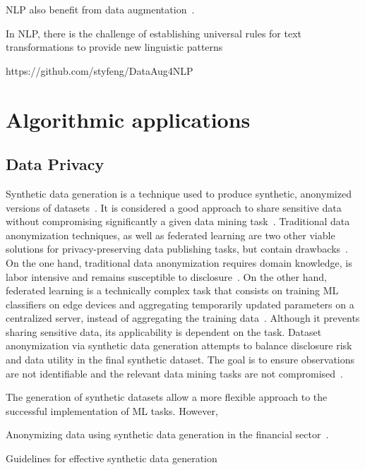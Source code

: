 \documentclass[parskip=full]{scrartcl}
\begin{document}
NLP also benefit from data augmentation~\cite{feng2021survey}.

In NLP, there is the challenge of establishing universal rules for text
transformations to provide new linguistic patterns~\cite{bayer2022data}

https://github.com/styfeng/DataAug4NLP

\section{Algorithmic applications}

\subsection{Data Privacy}

Synthetic data generation is a technique used to produce synthetic, anonymized
versions of datasets~\cite{dankar2021fake}. It is considered a good approach
to share sensitive data without compromising significantly a given data mining
task~\cite{taub2018differential, park2018data}. Traditional data anonymization
techniques, as well as federated learning are two other viable solutions for
privacy-preserving data publishing tasks, but contain
drawbacks~\cite{hernandez2022synthetic}. On the one hand, traditional data
anonymization requires domain knowledge, is labor intensive and remains
susceptible to disclosure~\cite{reiter2004new}. On the other hand, federated
learning is a technically complex task that consists on training ML
classifiers on edge devices and aggregating temporarily updated parameters on
a centralized server, instead of aggregating the training
data~\cite{yu2022survey}. Although it prevents sharing sensitive data, its
applicability is dependent on the task. Dataset anonymization via synthetic
data generation attempts to balance disclosure risk and data utility in the
final synthetic dataset. The goal is to ensure observations are not
identifiable and the relevant data mining tasks are not
compromised~\cite{singh2017aggregating, li2018privacy}.

The generation of synthetic datasets allow a more flexible approach to the
successful implementation of ML tasks. However,

Anonymizing data using synthetic data generation in the financial
sector~\cite{assefa2020generating}.

Guidelines for effective synthetic data generation~\cite{dankar2021fake}
\end{document}
